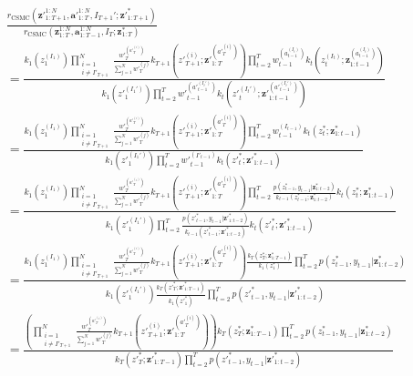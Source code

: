 \documentclass[11pt]{article}
\newcommand{\z}{\mathbf{z}}
\newcommand{\abold}{\mathbf{a}}
\begin{document}
\begin{align*}
& \frac{r_{\mathrm{CSMC}}({\z'}_{1:T+1}^{1:N}, {\abold'}_{1:T}^{1:N}, I_{T+1}'; {\z'}_{1:T+1}^*)}
{r_{\mathrm{CSMC}}(\z_{1:T}^{1:N}, \abold_{1:T-1}^{1:N}, I_T; \z_{1:T}^*)}\\
&= 
\frac{
k_1(z_1^{(I_1)}) \displaystyle \prod_{\substack{i=1\\i \ne I'_{T+1}}}^N \frac{{w'}_{T}^{({a'}_{T}^{(i)})}}{\sum_{j=1}^N {w'}_{T}^{(j)}} k_{T+1}({z'}_{T+1}^{(i)}; {\z'}_{1:T}^{({a'}_{T}^{(i)})} )
\prod_{t=2}^{T} {w}_{t-1}^{({a}_{t-1}^{(I_t)})} k_t({z}_t^{(I_t)}; {\z}_{1:t-1}^{({a}_{t-1}^{(I_t)})} )
}{
k_1({z'}_1^{(I_1')}) \displaystyle \prod_{t=2}^{T} {w'}_{t-1}^{({a'}_{t-1}^{(I_t')})} k_t({z'}_t^{(I_t')}; {\z'}_{1:t-1}^{({a'}_{t-1}^{(I_t')})} )
}\\
&=
\frac{
k_1(z_1^{(I_1)}) \displaystyle \prod_{\substack{i=1\\i \ne I'_{T+1}}}^N \frac{{w'}_{T}^{({a'}_{T}^{(i)})}}{\sum_{j=1}^N {w'}_{T}^{(j)}} k_{T+1}({z'}_{T+1}^{(i)}; {\z'}_{1:T}^{({a'}_{T}^{(i)})} )
\prod_{t=2}^{T} {w}_{t-1}^{(I_{t-1})} k_t({z}_t^*; {\z}_{1:t-1}^{*} )
}{
k_1({z'}_1^{(I_1')}) \displaystyle \prod_{t=2}^{T} {w'}_{t-1}^{(I'_{t-1})} k_t({z'}_t^{*}; {\z'}_{1:t-1}^{*} )
}\\
&=
\frac{
k_1(z_1^{(I_1)}) \displaystyle \prod_{\substack{i=1\\i \ne I'_{T+1}}}^N \frac{{w'}_{T}^{({a'}_{T}^{(i)})}}{\sum_{j=1}^N {w'}_{T}^{(j)}} k_{T+1}({z'}_{T+1}^{(i)}; {\z'}_{1:T}^{({a'}_{T}^{(i)})} )
\prod_{t=2}^{T} \frac{p(z_{t-1}^*, y_{t-1} | {\z}_{1:t-2}^{*})}{k_{t-1}(z_{t-1}^{*}; \z_{1:t-2}^{*})} k_t({z}_t^*; {\z}_{1:t-1}^{*} )
}{
k_1({z'}_1^{(I_1')}) \displaystyle \prod_{t=2}^{T} \frac{p({z'}_{t-1}^*, y_{t-1} | {\z'}_{1:t-2}^*)}{k_{t-1}({z'}_{t-1}^*; {\z'}_{1:t-2}^{*})} k_t({z'}_t^{*}; {\z'}_{1:t-1}^{*} )
}\\
&=
\frac{
k_1(z_1^{(I_1)}) \displaystyle \prod_{\substack{i=1\\i \ne I'_{T+1}}}^N \frac{{w'}_{T}^{({a'}_{T}^{(i)})}}{\sum_{j=1}^N {w'}_{T}^{(j)}} k_{T+1}({z'}_{T+1}^{(i)}; {\z'}_{1:T}^{({a'}_{T}^{(i)})} )
\frac{k_T(z_T^*; \z_{1:T-1}^*)}{k_1(z_1^*)} \prod_{t=2}^{T} p(z_{t-1}^*, y_{t-1} | {\z}_{1:t-2}^{*})
}{
k_1({z'}_1^{(I_1')}) \displaystyle \frac{k_T({z'}_T^*; {\z'}_{1:T-1}^*)}{k_1({z'}_1^*)} \prod_{t=2}^{T} p({z'}_{t-1}^*, y_{t-1} | {\z'}_{1:t-2}^*)
}\\
&=
\frac{
\left( \displaystyle \prod_{\substack{i=1\\i \ne I'_{T+1}}}^N \frac{{w'}_{T}^{({a'}_{T}^{(i)})}}{\sum_{j=1}^N {w'}_{T}^{(j)}} k_{T+1}({z'}_{T+1}^{(i)}; {\z'}_{1:T}^{({a'}_{T}^{(i)})} ) \right)
k_T(z_T^*; \z_{1:T-1}^*)
\displaystyle \prod_{t=2}^{T} p(z_{t-1}^*, y_{t-1} | {\z}_{1:t-2}^{*})
}{
\displaystyle k_T({z'}_T^*; {\z'}_{1:T-1}^*) \prod_{t=2}^{T} p({z'}_{t-1}^*, y_{t-1} | {\z'}_{1:t-2}^*)
}
\end{align*}
\end{document}
